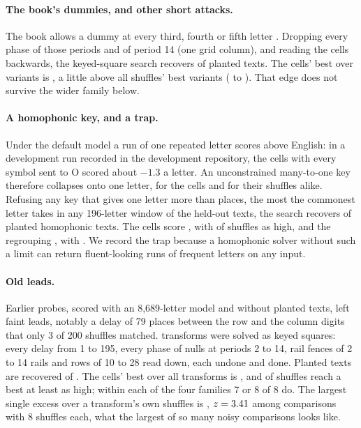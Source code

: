 \documentclass[11pt]{article}
\theoremstyle{definition}
\begin{document}
\paragraph{The book's dummies, and other short attacks.} The book allows a dummy at every third, fourth or fifth letter \cite{wikipedia2026}. Dropping every phase of those periods and of period 14 (one grid column), and reading the cells backwards, the keyed-square search recovers \quickRecovered{} of \quickPlanted{} planted texts. The cells' best over \quickVariants{} variants is \quickBest{}, a little above all \quickShuffles{} shuffles' best variants (\quickShuffleBestLow{} to \quickShuffleBestHigh{}). That edge does not survive the wider family below.

\paragraph{A homophonic key, and a trap.} Under the default model a run of one repeated letter scores above English: in a development run recorded in the development repository, the cells with every symbol sent to O scored about $-1.3$ a letter. An unconstrained many-to-one key therefore collapses onto one letter, for the cells and for their shuffles alike. Refusing any key that gives one letter more than \homCap{} places, the most the commonest letter takes in any 196-letter window of the held-out texts, the search recovers \homRecovered{} of \homPlanted{} planted homophonic texts. The cells score \homCells{}, with \homCellsAsHigh{} of \homShuffles{} shuffles as high, and the regrouping \homRegrouped{}, with \homRegroupedAsHigh{}. We record the trap because a homophonic solver without such a limit can return fluent-looking runs of frequent letters on any input.

\paragraph{Old leads.} Earlier probes, scored with an 8,689-letter model and without planted texts, left faint leads, notably a delay of 79 places between the row and the column digits that only 3 of 200 shuffles matched. \dirTransforms{} transforms were solved as keyed squares: every delay from 1 to 195, every phase of nulls at periods 2 to 14, rail fences of 2 to 14 rails and rows of 10 to 28 read down, each undone and done. Planted texts are recovered \dirRecovered{} of \dirPlanted{}. The cells' best over all transforms is \dirBest{}, and \dirAsHigh{} of \dirShuffles{} shuffles reach a best at least as high; within each of the four families 7 or 8 of 8 do. The largest single excess over a transform's own shuffles is \dirTopTransform{}, $z = 3.41{}$ among \dirTransforms{} comparisons with 8 shuffles each, what the largest of so many noisy comparisons looks like.
\end{document}
